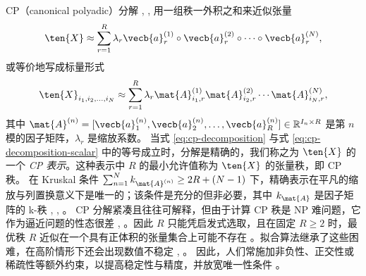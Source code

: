 CP（canonical polyadic）分解 \cite{hitchcock1927cp}, \cite{carroll1970analysis}, \cite{harshman1970foundations} 用一组秩一外积之和来近似张量
\begin{equation}
\label{eq:cp-decomposition}
    \ten{X} \approx \sum_{r=1}^{R}\lambda_r \vecb{a}^{(1)}_r\circ\vecb{a}^{(2)}_r\circ\cdots\circ\vecb{a}^{(N)}_r,
\end{equation}
或等价地写成标量形式
\begin{equation}
\label{eq:cp-decomposition-scalar}
    \ten{X}_{i_1, i_2, \dots, i_N} \approx \sum_{r=1}^{R}\lambda_r \mat{A}^{(1)}_{i_1, r}\mat{A}^{(2)}_{i_2, r}\cdots\mat{A}^{(N)}_{i_N, r},
\end{equation}
其中 $\mat{A}^{(n)} = [\vecb{a}^{(n)}_1, \vecb{a}^{(n)}_2, \dots, \vecb{a}^{(n)}_R] \in \mathbb{R}^{I_n \times R}$ 是第 $n$ 模的因子矩阵，$\lambda_r$ 是缩放系数。
当式 \eqref{eq:cp-decomposition} 与式 \eqref{eq:cp-decomposition-scalar} 中的等号成立时，分解是精确的，我们称之为 $\ten{X}$ 的一个 \emph{CP 表示}。这种表示中 $R$ 的最小允许值称为 $\ten{X}$ 的张量秩，即 CP 秩。
在 Kruskal 条件 $\sum_{n=1}^N k_{\mat{A}^{(n)}} \ge 2R + (N-1)$ 下，精确表示在平凡的缩放与列置换意义下是唯一的；该条件是充分的但非必要，其中 $k_{\mat{A}}$ 是因子矩阵的 k-秩 \cite{kruskal1977three}, \cite{sidiropoulos2000cpuniqueness}, \cite{kolda2009tensor}。
CP 分解紧凑且往往可解释，但由于计算 CP 秩是 NP 难问题，它作为逼近问题的性态很差 \cite{haastad1990tensor}, \cite{hillar2013most}。因此 $R$ 只能凭启发式选取，且在固定 $R \ge 2$ 时，最优秩 $R$ 近似在一个具有正体积的张量集合上可能不存在 \cite{de2008tensor}。拟合算法继承了这些困难，在高阶情形下还会出现数值不稳定 \cite{kolda2009tensor}, \cite{cichocki2015tensor}。
因此，人们常施加非负性、正交性或稀疏性等额外约束，以提高稳定性与精度，并放宽唯一性条件 \cite{cichocki2015tensor}。


